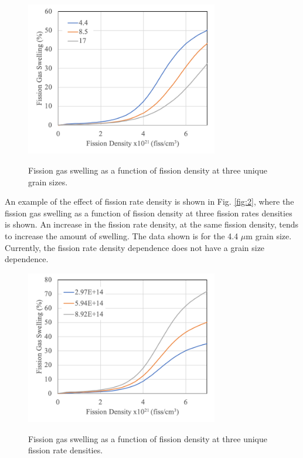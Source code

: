 \documentclass[11pt, oneside]{article}   	%
\begin{document}
\begin{figure}[htbp]
\begin{center}
\label{fig:1}
\includegraphics[width=0.75\textwidth]{Picture1.png}
\caption{Fission gas swelling as a function of fission density at three unique grain sizes.}
\label{default}
\end{center}
\end{figure}

An example of the effect of fission rate density is shown in Fig. \ref{fig:2}, where the fission gas swelling as a function of fission density at three fission rates densities is shown. An increase in the fission rate density, at the same fission density, tends to increase the amount of swelling. The data shown is for the 4.4 $\mu$m grain size. Currently, the fission rate density dependence does not have a grain size dependence. 

\begin{figure}[htbp]
\begin{center}
\label{fig:2}
\includegraphics[width=0.75\textwidth]{Picture2.png}
\caption{Fission gas swelling as a function of fission density at three unique fission rate densities.}
\label{default}
\end{center}
\end{figure}
\end{document}
